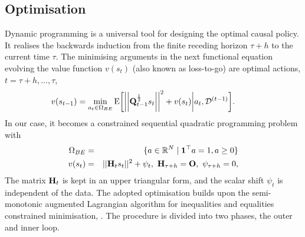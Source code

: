 \subsection{Optimisation}\label{s:optimization}
Dynamic programming \cite{Ber:17} is a universal tool for designing the optimal causal policy. It realises the backwards induction from the finite receding horizon $\tau+h$ to the current time $\tau$. The minimising arguments in the next functional equation evolving the value function $v(s_{t})$ (also known as loss-to-go)  are optimal actions, $t=\tau+h,\ldots,\tau$,
\begin{eqnarray*}
    &&\hspace*{-8ex}v(s_{t-1})= \min_{a_{t}\in \Omega_{BE}}\text{E}\bigg[\bigg|\bigg|\sqmat{Q}_{t-1} s_{t}\bigg|\bigg|^{2} + v(s_{t})\bigg| a_{t},\mathcal{D}^{(t-1)}\bigg].
\end{eqnarray*}
 In our case, it becomes a constrained sequential quadratic programming problem with
\begin{eqnarray}
\nonumber
\Omega_{BE} &=&\{a\in\mathbb{R}^N\mid \mathbf{1}^{\top}a= 1, a\geq 0\}\\
\nonumber
v(s_{t}) &=& ||\mathbf{H}_{t}s_{t}||^2 + \psi_{t},\ \mathbf{H}_{\tau+h}=\mathbf{O},\ \psi_{\tau+h}=0,
\end{eqnarray}
The matrix $\mathbf{H}_{t}$ is kept in an upper triangular form, and the scalar shift $\psi_{t}$ is independent of the data.
The adopted optimisation builds upon the semi-monotonic augmented Lagrangian algorithm for inequalities and equalities constrained minimisation, \cite{dostal2009optimal}. The procedure is divided into two phases, the outer and inner loop.


